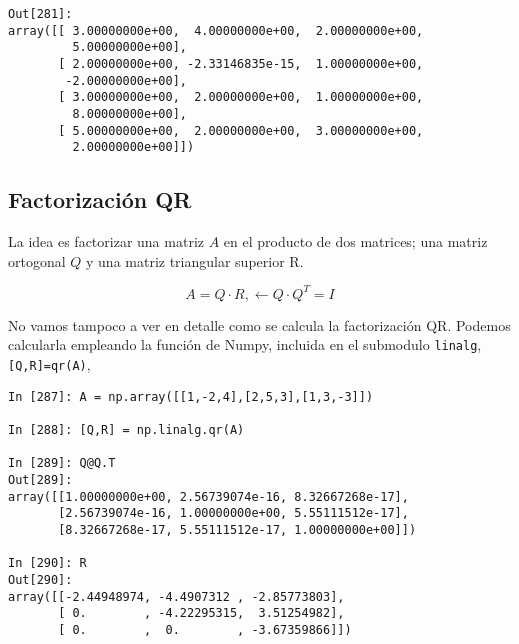\begin{center}
    \begin{minipage}{0.9\textwidth}
    \begin{verbatim}
Out[281]: 
array([[ 3.00000000e+00,  4.00000000e+00,  2.00000000e+00,
         5.00000000e+00],
       [ 2.00000000e+00, -2.33146835e-15,  1.00000000e+00,
        -2.00000000e+00],
       [ 3.00000000e+00,  2.00000000e+00,  1.00000000e+00,
         8.00000000e+00],
       [ 5.00000000e+00,  2.00000000e+00,  3.00000000e+00,
         2.00000000e+00]])

    \end{verbatim}    
    \end{minipage}
\end{center}


\begin{paracol}{2}
\subsection{Factorización QR} \label{QR}
La idea es factorizar una matriz $A$ en el producto de dos matrices; una matriz ortogonal $Q$ y una matriz triangular superior R.
\end{paracol}
\begin{equation*}
A=Q\cdot R, \leftarrow Q\cdot Q^T=I
\end{equation*}
\begin{paracol}{2}
No vamos tampoco a ver en detalle como se calcula la factorización QR. Podemos calcularla empleando la función de Numpy, incluida en el submodulo \texttt{linalg}, \texttt{[Q,R]=qr(A)},
\end{paracol}
\begin{center}
    \begin{minipage}{0.7\textwidth}
    \begin{verbatim}
In [287]: A = np.array([[1,-2,4],[2,5,3],[1,3,-3]])

In [288]: [Q,R] = np.linalg.qr(A)

In [289]: Q@Q.T
Out[289]: 
array([[1.00000000e+00, 2.56739074e-16, 8.32667268e-17],
       [2.56739074e-16, 1.00000000e+00, 5.55111512e-17],
       [8.32667268e-17, 5.55111512e-17, 1.00000000e+00]])

In [290]: R
Out[290]: 
array([[-2.44948974, -4.4907312 , -2.85773803],
       [ 0.        , -4.22295315,  3.51254982],
       [ 0.        ,  0.        , -3.67359866]])
    \end{verbatim}    
    \end{minipage}
\end{center}


